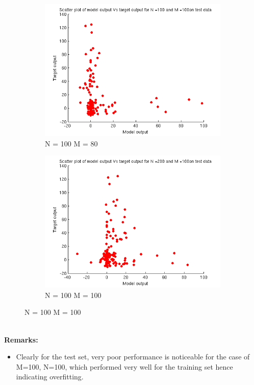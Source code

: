 \documentclass{article}
\begin{document}
\begin{figure}
\begin{subfigure}{.5\textwidth}
\centering
\includegraphics[width=\linewidth]{t1}
\caption{N = 100 M = 80}
\end{subfigure}
\begin{subfigure}{.5\textwidth}
\includegraphics[width=\linewidth]{t2}
\caption{N = 100 M = 100}
\end{subfigure}
\end{figure}
\textbf{\\[10pt]Remarks:}
\begin{itemize}
\item Clearly for the test set, very poor performance is noticeable for the case of M=100, N=100, which performed very well for the training set hence indicating overfitting.
\end{itemize}
\end{document}
